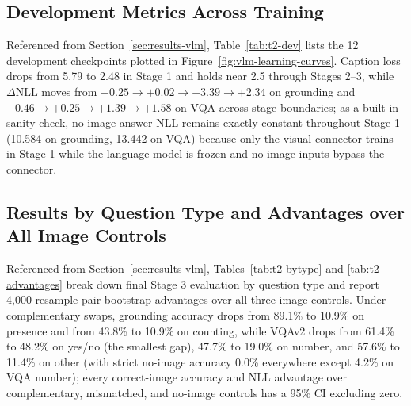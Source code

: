 \documentclass{article}
\begin{document}
\subsection{Development Metrics Across Training}
\label{app:vlm-dev}
Referenced from Section~\ref{sec:results-vlm}, Table~\ref{tab:t2-dev} lists the 12 development checkpoints plotted in Figure~\ref{fig:vlm-learning-curves}. Caption loss drops from 5.79 to 2.48 in Stage 1 and holds near 2.5 through Stages 2--3, while $\Delta\text{NLL}$ moves from $+0.25 \to +0.02 \to +3.39 \to +2.34$ on grounding and $-0.46 \to +0.25 \to +1.39 \to +1.58$ on VQA across stage boundaries; as a built-in sanity check, no-image answer NLL remains exactly constant throughout Stage 1 (10.584 on grounding, 13.442 on VQA) because only the visual connector trains in Stage 1 while the language model is frozen and no-image inputs bypass the connector.


\subsection{Results by Question Type and Advantages over All Image Controls}
\label{app:vlm-bytype}
Referenced from Section~\ref{sec:results-vlm}, Tables~\ref{tab:t2-bytype} and \ref{tab:t2-advantages} break down final Stage 3 evaluation by question type and report 4,000-resample pair-bootstrap advantages over all three image controls. Under complementary swaps, grounding accuracy drops from 89.1\% to 10.9\% on presence and from 43.8\% to 10.9\% on counting, while VQAv2 drops from 61.4\% to 48.2\% on yes/no (the smallest gap), 47.7\% to 19.0\% on number, and 57.6\% to 11.4\% on other (with strict no-image accuracy 0.0\% everywhere except 4.2\% on VQA number); every correct-image accuracy and NLL advantage over complementary, mismatched, and no-image controls has a 95\% CI excluding zero.


\end{document}
